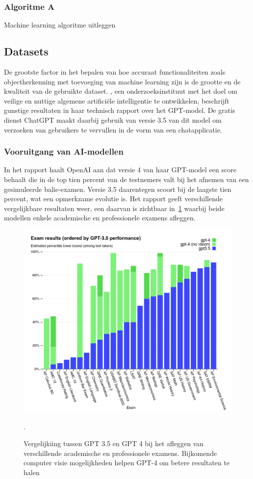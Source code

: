 \subsubsection{Algoritme A}
Machine learning algoritme uitleggen

\subsection{Datasets}
\label{subsec:datasets}
De grootste factor in het bepalen van hoe accuraat functionaliteiten zoals objectherkenning met toevoeging van machine learning zijn is de grootte en de kwaliteit van de gebruikte dataset.
\textcite{OpenAI2023}, een onderzoeksinstituut met het doel om veilige en nuttige algemene artifici\"ele intelligentie te ontwikkelen, beschrijft gunstige resultaten in haar technisch rapport over het GPT-model.
De gratis dienst ChatGPT maakt daarbij gebruik van versie 3.5 van dit model om verzoeken van gebruikers te vervullen in de vorm van een chatapplicatie.

\subsubsection{Vooruitgang van AI-modellen}
In het rapport haalt OpenAI aan dat versie 4 van haar GPT-model een score behaalt die in de top tien percent van de testnemers valt bij het afnemen van een gesimuleerde balie-examen.
Versie 3.5 daarentegen scoort bij de laagste tien percent, wat een opmerkzame evolutie is.
Het rapport geeft verschillende vergelijkbare resultaten weer, een daarvan is zichtbaar in~\ref{fig:gpt3.5-versus-4} waarbij beide modellen enkele academische en professionele examens afleggen.
\begin{figure}
    \includegraphics[width=1\linewidth]{images/gpt35-vs-4-exam-resutls}
    \caption{Vergelijkiing tussen GPT 3.5 en GPT 4 bij het afleggen van verschillende academische en professionele examens. Bijkomende computer visie mogelijkheden helpen GPT-4 om betere resultaten te halen~\autocite{OpenAI2023}}.
    \label{fig:gpt3.5-versus-4}
\end{figure}

